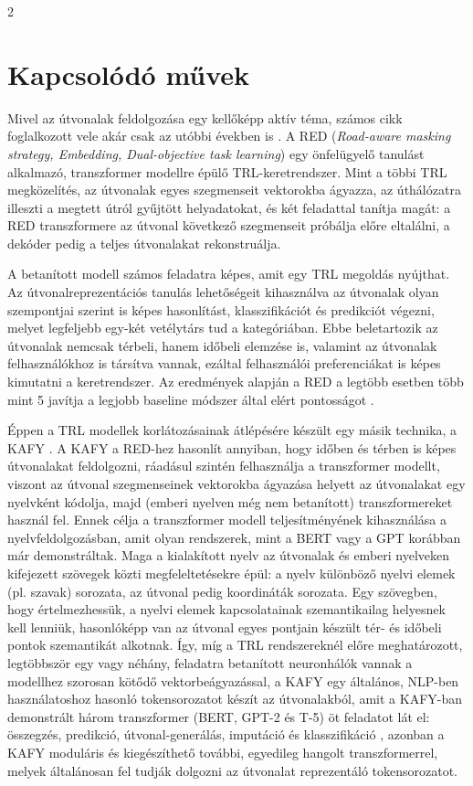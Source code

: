 \documentclass{article}
\begin{document}
\begin{multicols}{2}
\section{Kapcsolódó művek}

Mivel az útvonalak feldolgozása egy kellőképp aktív téma, számos cikk foglalkozott vele akár csak az utóbbi években is \cite{hussein2026kafy}. A RED \cite{zhou2024red}
(\textit{Road-aware masking strategy, Embedding, Dual-objective task learning}) egy önfelügyelő tanulást alkalmazó, transzformer modellre
épülő TRL-keretrendszer. Mint a többi TRL megközelítés, az útvonalak egyes szegmenseit vektorokba ágyazza, az úthálózatra illeszti a
megtett útról gyűjtött helyadatokat, és két feladattal tanítja magát: a RED transzformere az útvonal következő szegmenseit próbálja előre eltalálni, 
a dekóder pedig a teljes útvonalakat rekonstruálja. \cite{zhou2024red}

A betanított modell számos feladatra képes, amit egy TRL megoldás nyújthat. Az útvonalreprezentációs tanulás lehetőségeit kihasználva
az útvonalak olyan szempontjai szerint is képes hasonlítást, klasszifikációt és predikciót végezni, melyet legfeljebb egy-két
vetélytárs tud a kategóriában. Ebbe beletartozik az útvonalak nemcsak térbeli, hanem időbeli elemzése is, valamint az útvonalak felhasználókhoz is társítva
vannak, ezáltal felhasználói preferenciákat is képes kimutatni a keretrendszer. Az eredmények alapján a RED a legtöbb esetben több mint 5%
javítja a legjobb baseline módszer által elért pontosságot \cite{zhou2024red}.

Éppen a TRL modellek korlátozásainak átlépésére készült egy másik technika, a KAFY \cite{hussein2026kafy}. A KAFY a RED-hez hasonlít annyiban, hogy időben és térben is képes útvonalakat feldolgozni,
ráadásul szintén felhasználja a transzformer modellt, viszont az útvonal szegmenseinek vektorokba ágyazása helyett az útvonalakat egy nyelvként \cite{devlin2018bert} kódolja, majd (emberi nyelven
még nem betanított) transzformereket használ fel. Ennek célja a transzformer modell teljesítményének kihasználása a nyelvfeldolgozásban, amit olyan rendszerek, mint a BERT \cite{devlin2018bert}
vagy a GPT \cite{yenduri2023generative} korábban már demonstráltak. Maga a kialakított nyelv az útvonalak és emberi nyelveken kifejezett szövegek közti
megfeleltetésekre épül: a nyelv különböző nyelvi elemek (pl. szavak) sorozata, az útvonal pedig koordináták sorozata. Egy szövegben,
hogy értelmezhessük, a nyelvi elemek kapcsolatainak szemantikailag helyesnek kell lenniük, hasonlóképp van az útvonal egyes pontjain
készült tér- és időbeli pontok szemantikát alkotnak. Így, míg a TRL rendszereknél előre meghatározott, legtöbbször egy vagy néhány,
feladatra betanított neuronhálók vannak a modellhez szorosan kötődő vektorbeágyazással, a KAFY egy általános, NLP-ben használatoshoz
hasonló tokensorozatot készít az útvonalakból, amit a KAFY-ban demonstrált három transzformer (BERT, GPT-2 és T-5) öt feladatot
lát el: összegzés, predikció, útvonal-generálás, imputáció és klasszifikáció \cite{hussein2026kafy}, azonban a KAFY moduláris és kiegészíthető további, egyedileg
hangolt transzformerrel, melyek általánosan fel tudják dolgozni az útvonalat reprezentáló tokensorozatot.


\end{multicols}
\end{document}
